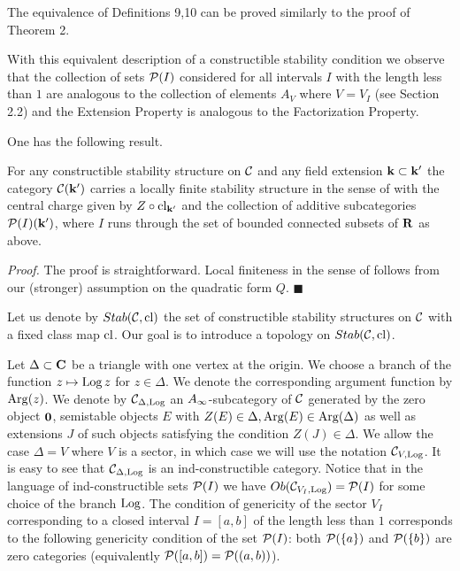 \documentclass[12pt]{article}
\begin{document}
\begin{defn}
\begin{itemize}
\end{itemize}

\end{defn}


The equivalence of Definitions 9,10 can be proved similarly to the proof of Theorem 2.

With this equivalent description of a constructible stability condition we observe that the collection of sets ${\cal P}(I)$ considered for all intervals $I$ with the length less than $1$ are analogous to the collection of elements $A_V$ where $V=V_I$ (see Section 2.2) and the Extension Property is analogous to the Factorization Property.

One has the following result.

\begin{prp} For any constructible stability structure on ${\mathcal C}$ and any field extension ${\bf k}\subset {\bf k}^{\prime}$ the   category ${\mathcal C}({\bf k}^{\prime})$ carries a locally finite stability structure in the sense of \cite{Br1} with the central charge given by $Z\circ \operatorname{cl}_{{{\bf k}}^{\prime}}$ and the collection of additive subcategories ${\cal P}(I)({{\bf k}}^{\prime})$,
where $I$ runs through the set of bounded connected subsets of ${\bf R}$ as above.




\end{prp}

{\it Proof.} The proof is straightforward. Local finiteness in the sense of \cite{Br1} follows from our (stronger) assumption on the quadratic form $Q$. $\blacksquare$

Let us denote by $Stab({\mathcal C},\operatorname{cl})$ the set of constructible stability structures on ${\mathcal C}$ with a fixed class map $\operatorname{cl}$.
Our goal is to introduce a topology on $Stab({\mathcal C},\operatorname{cl})$. 

Let $\Delta\subset {\bf C}$ be a triangle with one vertex at the origin. We choose a branch  of the function $z\mapsto \operatorname{Log} z$ for $z\in \Delta$. We denote the corresponding argument function by $\operatorname{Arg}(z)$.
We denote by ${{\mathcal C}}_{{\Delta},\operatorname{Log}}$
an $A_{\infty}$-subcategory of ${\mathcal C}$ generated by the zero object ${\bf 0}$, semistable objects $E$ with $Z(E)\in \Delta, \operatorname{Arg}(E)\in \operatorname{Arg}(\Delta)$ as well as extensions $J$
of such objects satisfying the condition $Z(J)\in \Delta$. We allow the case $\Delta=V$ where $V$ is a sector, in which case we will use the notation ${\mathcal C}_{V,\operatorname{Log}}$.
It is easy to see that
${\mathcal C}_{{\Delta},\operatorname{Log}}$ is an ind-constructible  category.
Notice that in the language of ind-constructible sets ${\cal P}(I)$ we have $Ob({\mathcal C}_{{V_I},\operatorname{Log}})={\cal P}(I)$ for some choice of the branch $\operatorname{Log}$. The condition of genericity of the sector $V_I$ corresponding to a closed interval $I=[a,b]$ of the length less than $1$ corresponds
to the following genericity condition of the set ${\cal P}(I)$: both ${\cal P}(\{a\})$ and
${\cal P}(\{b\})$ are zero categories (equivalently ${\cal P}([a,b])={\cal P}((a,b))$).
\end{document}
